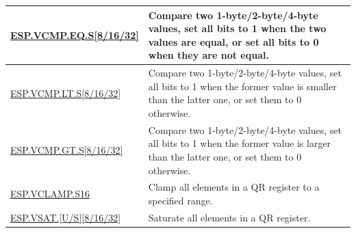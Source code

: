 \begin{longtable}[c]{|l|m{11cm}|}
    \hyperref[instruction:ESPVCMPEQS8]{ESP.VCMP.EQ.S[8/16/32]} & Compare two 1-byte/2-byte/4-byte values, set all bits to 1 when the two values are equal, or set all bits to 0 when they are not equal.
    \\\hline
    \hyperref[instruction:ESPVCMPLTS8]{ESP.VCMP.LT.S[8/16/32]} & Compare two 1-byte/2-byte/4-byte values, set all bits to 1 when the former value is smaller than the latter one, or set them to 0 otherwise.
    \\\hline
    \hyperref[instruction:ESPVCMPGTS8]{ESP.VCMP.GT.S[8/16/32]} & Compare two 1-byte/2-byte/4-byte values, set all bits to 1 when the former value is larger than the latter one, or set them to 0 otherwise.
    \\\hline
    \hyperref[instruction:ESPVCLAMPS16]{ESP.VCLAMP.S16} & Clamp all elements in a QR register to a specified range.
    \\\hline
    \hyperref[instruction:ESPVSATU8]{ESP.VSAT.[U/S][8/16/32]} & Saturate all elements in a QR register.
    \\\hline
\end{longtable}
